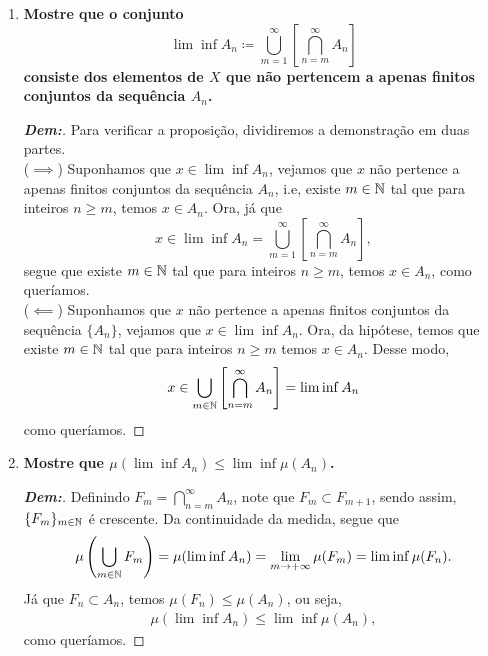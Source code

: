 \begin{enumerate}[label=(\alph*), wide, labelindent=0pt]
\begin{proof}[\textbf{Dem:}]
      \begin{align*}
        \mu(\lim\sup A_n) = \lim_{n \rightarrow +\infty}\mu(F_n) = 
        \lim\sup \mu(F_n) \ge \lim\sup \mu(A_n).
      \end{align*}
      Com isso, temos o que queríamos. Como exemplo em que a desigualdade é falsa, 
      considere $A_n = (n, +\infty)$. Já que $\mu(A_n) = +\infty$ para todo $n \in \mbb N$,
      então, $\lim\sup \mu(A_n) = +\infty$. Entretanto, visto que para todo $x \in \mbb R$,
      existe $M \in \mbb N$ tal que $x < M$, segue que $\lim\sup A_n = \emptyset$, ou seja, 
      $\mu(\lim\sup A_n) = 0$.
    \end{proof}
  \item \textbf{Mostre que o conjunto 
    $$\lim \inf A_n \coloneq \bigcup\limits_{m=1}^\infty\left[\bigcap\limits_{n=m}^\infty 
    A_n\right]$$
    consiste dos elementos de $X$ que não pertencem a apenas finitos conjuntos da  
    sequência $A_n$.}
    \begin{proof}[\textbf{Dem:}] Para verificar a proposição, dividiremos a demonstração 
      em duas partes.\\
      ($\implies$) Suponhamos que $x \in \lim\inf A_n$, vejamos que $x$ não pertence a apenas 
      finitos conjuntos da sequência $A_n$, i.e, existe $m \in \mathbb N$ tal que para 
      inteiros $n \ge m$, temos $x \in A_n$. Ora, já que
      $$x \in \lim\inf A_n = \bigcup\limits_{m=1}^\infty\left[\bigcap\limits_{n=m}^\infty 
    A_n\right],$$
      segue que existe $m \in \mathbb N$ tal que para inteiros $n \ge m$, temos $x \in A_n$,
      como queríamos.\\
      ($\impliedby$) Suponhamos que $x$ não pertence a apenas finitos conjuntos da sequência 
      $\{A_n\}$, vejamos que $x \in \lim\inf A_n$. Ora, da hipótese, temos que existe 
      $m \in \mathbb N$ tal que para inteiros $n \ge m$ temos $x \in A_n$. Desse modo, 
      $$x \in \bigcup\limits_{m \in \mathbb N}\left[\bigcap\limits_{n=m}^\infty A_n\right]
      = \lim \inf A_n$$
      como queríamos.
    \end{proof}
  \item \textbf{Mostre que $\mu(\lim \inf A_n) \le \lim\inf \mu(A_n)$.}
    \begin{proof}[\textbf{Dem:}] Definindo $F_m = \bigcap\limits_{n = m}^\infty A_n$,
      note que $F_m \subset F_{m+1}$, sendo assim, $\{F_m\}_{m \in \mathbb N}$ é crescente. 
      Da continuidade da medida, segue que 
      \begin{align*}
        \mu\left(\bigcup_{m \in \mathbb N} F_m\right)
        = \mu(\lim\inf A_n)
        = \lim_{m \rightarrow +\infty} \mu(F_m) = \lim\inf \mu(F_n).
      \end{align*}
      Já que $F_n \subset A_n$, temos $\mu(F_n) \le \mu(A_n)$, ou seja,
      \begin{align*}
        \mu(\lim\inf A_n) \le \lim\inf \mu(A_n),
      \end{align*}
      como queríamos.
    \end{proof}
\end{enumerate}
\biglinend

